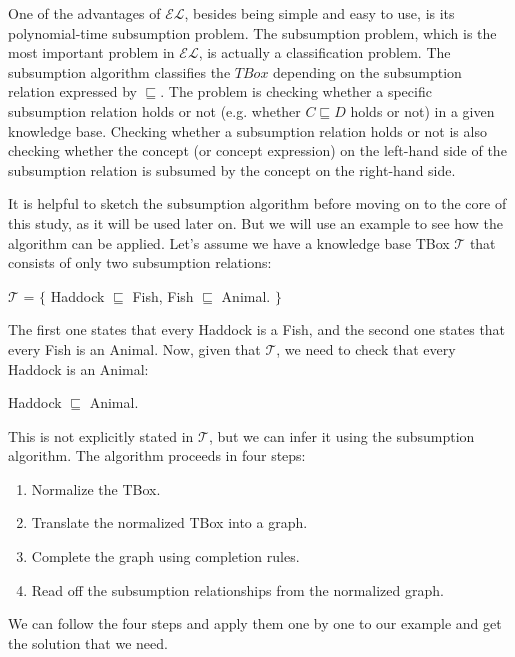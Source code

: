 One of the advantages of $\mathcal{EL}$, besides being simple and easy to use, is its polynomial-time subsumption problem. The subsumption problem, which is the most important problem in $\mathcal{EL}$, is actually a classification problem. The subsumption algorithm classifies the $TBox$ depending on the subsumption relation expressed by $\sqsubseteq$. The problem is checking whether a specific subsumption relation holds or not (e.g. whether $C \sqsubseteq D$ holds or not) in a given knowledge base. Checking whether a subsumption relation holds or not is also checking whether the concept (or concept expression) on the left-hand side of the subsumption relation is subsumed by the concept on the right-hand side.

It is helpful to sketch the subsumption algorithm before moving on to the core of this study, as it will be used later on. But we will use an example to see how the algorithm can be applied. Let's assume we have a knowledge base TBox $\mathcal{T}$ that consists of only two subsumption relations:
\begin{center}
$\mathcal{T}$ = $\lbrace$ Haddock $\sqsubseteq$ Fish, Fish $\sqsubseteq$ Animal. $\rbrace$
\end{center}
The first one states that every Haddock is a Fish, and the second one states that every Fish is an Animal. Now, given that $\mathcal{T}$, we need to check that every Haddock is an Animal:
\begin{center}
Haddock $\sqsubseteq$ Animal.
\end{center}
This is not explicitly stated in $\mathcal{T}$, but we can infer it using the subsumption algorithm. The algorithm proceeds in four steps:
\begin{enumerate}
\item Normalize the TBox.
\item Translate the normalized TBox into a graph.
\item Complete the graph using completion rules.
\item Read off the subsumption relationships from the normalized graph.
\end{enumerate}
We can follow the four steps and apply them one by one to our example and get the solution that we need.

